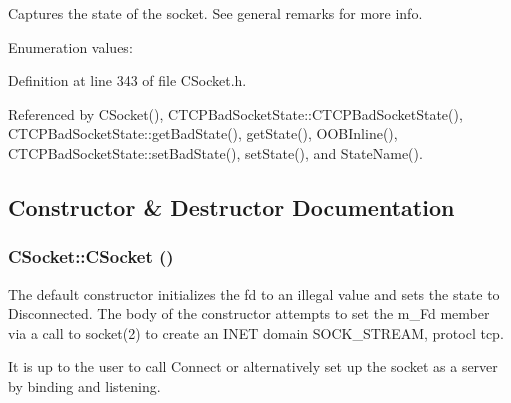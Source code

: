 Captures the state of the socket. See general remarks for more info.

\begin{Desc}
\item[Enumeration values:]\par
\begin{description}
\item[{\em 
{\em Disconnected}\label{classCSocket_s4s0}
}]\item[{\em 
{\em Bound}\label{classCSocket_s4s1}
}]\item[{\em 
{\em Listening}\label{classCSocket_s4s2}
}]\item[{\em 
{\em Connected}\label{classCSocket_s4s3}
}]\end{description}
\end{Desc}



Definition at line 343 of file CSocket.h.

Referenced by CSocket(), CTCPBad\-Socket\-State::CTCPBad\-Socket\-State(), CTCPBad\-Socket\-State::get\-Bad\-State(), get\-State(), OOBInline(), CTCPBad\-Socket\-State::set\-Bad\-State(), set\-State(), and State\-Name().

\subsection{Constructor \& Destructor Documentation}
\subsubsection{\setlength{\rightskip}{0pt plus 5cm}CSocket::CSocket ()}\label{classCSocket_a0}


The default constructor initializes the fd to an illegal value and sets the state to Disconnected.  The body of the constructor attempts to set the m\_\-Fd member via a call to  socket(2) to create an INET domain SOCK\_\-STREAM, protocl tcp.

It is up to the user to call Connect or alternatively set up the socket as a server by binding and listening.

